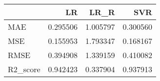 \begin{tabular}{lrrr}
\toprule
{} &  LR &   LR\_R &  SVR \\
\midrule
MAE       &            0.295506 &  1.005797 &                 0.300560 \\
MSE       &            0.155953 &  1.793347 &                 0.168167 \\
RMSE      &            0.394908 &  1.339159 &                 0.410082 \\
 R2\_score &            0.942423 &  0.337904 &                 0.937913 \\
\bottomrule
\end{tabular}
